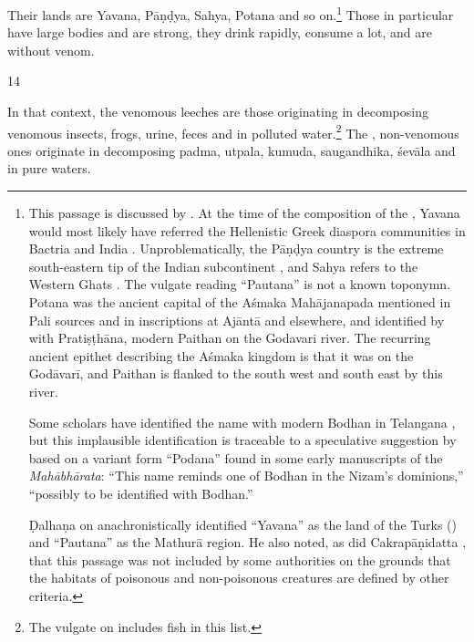 \begin{translation}
Their lands are Yavana, Pāṇḍya, Sahya, Potana and so on.\footnote{This
    passage is discussed by \citet[109--110, 388--389]{kart-2015}.  At the time
    of the composition of the \SS, Yavana would most likely have referred the
    Hellenistic Greek diaspora communities in Bactria and India
    \parencites[136--137]{law-1984}{mair-2013}{mair-2014}. Unproblematically,
    the Pāṇḍya country is the extreme south-eastern tip of the Indian
    subcontinent \citep[E8, p.\,20 \emph{et passim}]{schw-1978}, and Sahya
    refers to the Western Ghats \citep[D5--7, p.\,20 \emph{et
    passim}]{schw-1978}.  The vulgate reading “Pautana” is not a known toponymn.
    Potana was the ancient capital of the Aśmaka Mahājanapada mentioned in Pali
    sources and in inscriptions at Ajāntā and elsewhere, and identified by
    \textcites[142, 179]{law-1984}[18]{gupt-1989} with Pratiṣṭhāna, modern
    Paithan on the Godavari river.  The recurring ancient epithet describing the
    Aśmaka kingdom is that it was on the Godāvarī, and Paithan is flanked to the
    south west and south east by this river.
    
    Some scholars have identified the name with modern Bodhan in Telangana
\parencites[189]{sirc-1971}[E6, p.\,14, 140 \emph{et
passim}]{schw-1978}[102]{sen-1988}, but this implausible identification
is traceable to a speculative suggestion by \citet[89, n.\,5,
143]{rayc-1953} based on a variant form “Podana” found in some early
manuscripts of the \emph{Mahābhārata}: “This name reminds one of Bodhan
in the Nizam's dominions,” “possibly to be identified with Bodhan.”
    
         Ḍalhaṇa on  anachronistically identified “Yavana”
as the land of the Turks () and “Pautana” as the
Mathurā region.  He also noted, as did Cakrapāṇidatta
\citep[97]{acar-1939}, that this passage was not included by some
authorities on the grounds that the habitats of poisonous and
non-poisonous creatures are defined by other criteria.}  Those in
particular have large bodies and are strong, they drink rapidly,
consume a lot, and are without venom.

\item [14]

In that context, the venomous leeches are those originating in decomposing
venomous insects, frogs, urine, feces and in polluted water.\footnote{The
    vulgate on  includes fish in this list.}  The , non-venomous
    ones originate in decomposing \gls{padma}, \gls{utpala}, \gls{kumuda},
    \gls{saugandhika}, \gls{śevāla} and in pure waters.


\end{translation}
